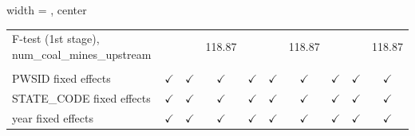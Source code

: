 \begin{table}[htbp]
\begin{adjustbox}{width = \textwidth, center}
\begin{tabular}{lccccccccc}
         F-test (1st stage), num\_coal\_mines\_upstream    &                       &                & 118.87        &               &               & 118.87        &               &                & 118.87\\  
          \\
         PWSID fixed effects                               & $\checkmark$          & $\checkmark$   & $\checkmark$  & $\checkmark$  & $\checkmark$  & $\checkmark$  & $\checkmark$  & $\checkmark$   & $\checkmark$\\   
         STATE\_CODE fixed effects                         & $\checkmark$          & $\checkmark$   & $\checkmark$  & $\checkmark$  & $\checkmark$  & $\checkmark$  & $\checkmark$  & $\checkmark$   & $\checkmark$\\   
         year fixed effects                                & $\checkmark$          & $\checkmark$   & $\checkmark$  & $\checkmark$  & $\checkmark$  & $\checkmark$  & $\checkmark$  & $\checkmark$   & $\checkmark$\\   
         \bottomrule
      \end{tabular}
   \end{adjustbox}
\end{table}


